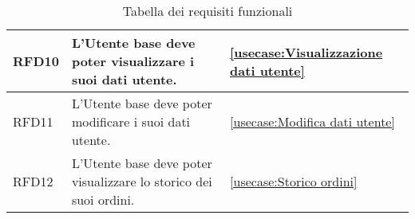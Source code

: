\begin{table}[H]
\begin{tabularx}{\textwidth}{l|X|p{2cm}}
		\hline
		RFD10      & L'Utente base deve poter visualizzare i suoi dati utente.                                                    			&  \autoref{usecase:Visualizzazione dati utente}           \\
		\hline
		RFD11       & L'Utente base deve poter modificare i suoi dati utente.						                                            &  \autoref{usecase:Modifica dati utente}           \\
		\hline
		RFD12       & L'Utente base deve poter visualizzare lo storico dei suoi ordini.                                                        					& \autoref{usecase:Storico ordini}            \\
\end{tabularx}
\caption{Tabella dei requisiti funzionali}
\end{table}

